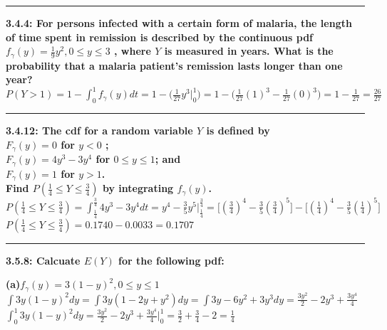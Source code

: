 \documentclass[11pt]{article}
\newcommand\question[2]{\vspace{.25in}\hrule\textbf{#1: #2}\vspace{.5em}\vspace{.10in}}
\renewcommand\part[1]{\vspace{.10in}\textbf{(#1)}}
\begin{document}
\raggedright
\newcommand\NAME{Jonathan Lopez}  %
\newcommand\HWNUM{3}              %



\question{3.4.4}
{For persons infected with a certain form of malaria, the length of time spent in
remission is described by the continuous pdf 
$f_{\gamma} (y) = \frac{1}{9}y^{2},0 \leq y \leq 3$
, where $Y$ is measured in years. What is the probability that a malaria patient's
remission lasts longer than one year?} \\
$
P(Y > 1) 
= 
1 - \int_{0}^{1}f_{\gamma}(y)dt 
= 
1 - \Big(\frac{1}{27}y^{3} \Big|_{0}^{1}\Big)
=
1 - \Big(\frac{1}{27}(1)^{3}-\frac{1}{27}(0)^{3}\Big)
=
1 - \frac{1}{27}
=
\frac{26}{27}
$




\question{3.4.12}
{The cdf for a random variable $Y$ is defined by \\
$F_{\gamma} (y) = 0$ for $y < 0$ ;\\
$F_{\gamma} (y) = 4y^{3}-3y^{4}$ for $0 \leq y \leq 1$; and \\
$F_{\gamma} (y) = 1$ for $y > 1$.\\
Find 
$P(\frac{1}{4} \leq Y \leq \frac{3}{4})$
by integrating $f_{\gamma} (y)$.
}
\\
$
P(\frac{1}{4} \leq Y \leq \frac{3}{4})
=
\int_{\frac{1}{4}}^{\frac{3}{4}}4y^{3}-3y^{4}dt
=
y^{4}-\frac{3}{5}y^{5} \Big|_{\frac{1}{4}}^{\frac{3}{4}}
=
\Big[(\frac{3}{4})^4-\frac{3}{5}(\frac{3}{4})^{5}\Big]
-
\Big[(\frac{1}{4})^4-\frac{3}{5}(\frac{1}{4})^{5}\Big]
$
\\
$
P(\frac{1}{4} \leq Y \leq \frac{3}{4}) 
= 0.1740 - 0.0033 = 0.1707
$

\question{3.5.8}
{Calcuate $E(Y)$ for the following pdf:}

\part{a}$f_{\gamma} (y) = 3(1-y)^{2}, 0 \leq y \leq 1$
\\
$
\int 3y(1-y)^{2}dy 
= 
\int 3y(1 - 2y + y^{2})dy
=
\int 3y - 6y^{2} + 3y^{3} dy
=
\frac{3y^{2}}{2} - 2y^{3} + \frac{3y^{4}}{4}
$
\\
$
\int_{0}^{1} 3y(1-y)^{2}dy 
=
\frac{3y^{2}}{2} - 2y^{3} + \frac{3y^{4}}{4} \Big|_{0}^{1}
=
\frac{3}{2} + \frac{3}{4} - 2 = \frac{1}{4}
$
\\ 
\end{document}
